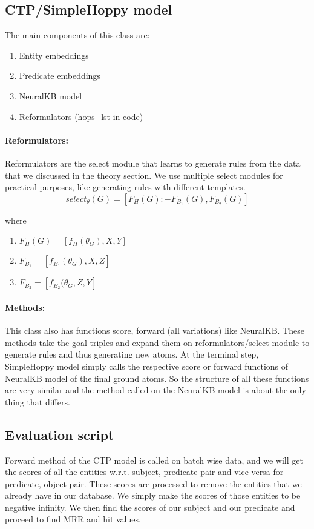\documentclass[Other]{iitddiss}
\begin{document}
\subsection{CTP/SimpleHoppy model}
The main components of this class are:
\begin{enumerate}
\item Entity embeddings
\item Predicate embeddings
\item NeuralKB model
\item Reformulators (hops\_lst in code)
\end{enumerate}

\paragraph{Reformulators:} 
Reformulators are the select module that learns to generate rules from the data that we discussed in the theory section. We use multiple select modules for practical purposes, like generating rules with different templates.
\[ select_{\theta}(G) = [ F_H(G) :- F_{B_1}(G), F_{B_2}(G)] \]

where
\begin{enumerate}
	\item \( F_H(G) = [ f_H(\theta_G), X, Y] \)
	\item \( F_{B_1} = [ f_{B_1}(\theta_G), X, Z] \)
	\item \( F_{B_2} = [ f_{B_2}(\theta_G, Z, Y] \)
\end{enumerate}


\paragraph{Methods:} 
This class also has functions score, forward (all variations) like NeuralKB. These methods take the goal triples and expand them on reformulators/select module to generate rules and thus generating new atoms. At the terminal step, SimpleHoppy model simply calls the respective score or forward functions of NeuralKB model of the final ground atoms. So the structure of all these functions are very similar and the method called on the NeuralKB model is about the only thing that differs.

\subsection{Evaluation script}
Forward method of the CTP model is called on batch wise data, and we will get the scores of all the entities w.r.t. subject, predicate pair and vice versa for predicate, object pair. These scores are processed to remove the entities that we already have in our database. We simply make the scores of those entities to be negative infinity. We then find the scores of our subject and our predicate and proceed to find MRR and hit values.
\end{document}
